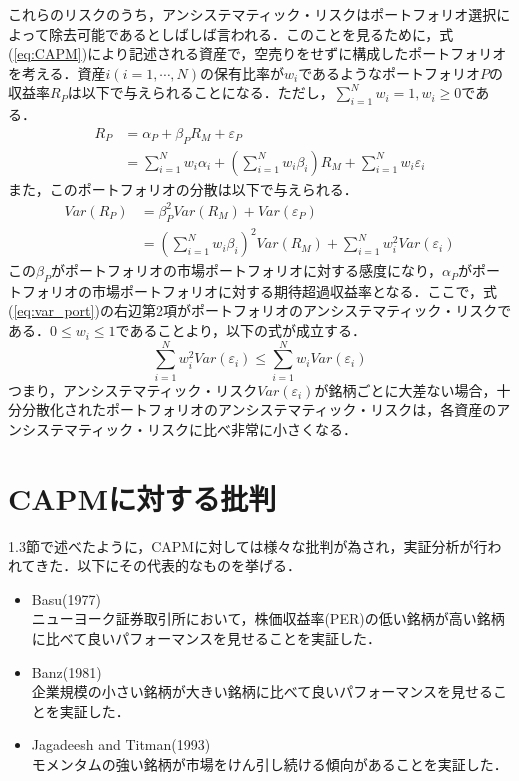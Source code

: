 ﻿\documentclass[11pt]{jreport}
\begin{document}
これらのリスクのうち，アンシステマティック・リスクはポートフォリオ選択によって除去可能であるとしばしば言われる．このことを見るために，式(\ref{eq:CAPM})により記述される資産で，空売りをせずに構成したポートフォリオを考える．資産$i(i=1,\cdots,N)$の保有比率が$w_i$であるようなポートフォリオ$P$の収益率$R_P$は以下で与えられることになる．ただし，$\sum_{i=1}^N w_i = 1, w_i\geq0$である．
\begin{equation}
\begin{split}
R_P &= \alpha_P + \beta_PR_M + \varepsilon_P\\
&= \sum_{i=1}^N w_i\alpha_i
+\left(\sum_{i=1}^N w_i\beta_i\right)R_M
+\sum_{i=1}^N w_i\varepsilon_i
\end{split}
\end{equation}
また，このポートフォリオの分散は以下で与えられる．
\begin{equation}
\begin{split}
Var(R_P) &= \beta_P^2 Var(R_M) + Var(\varepsilon_P)\\
& = \left(\sum_{i=1}^N w_i\beta_i\right)^2Var(R_M) + \sum_{i=1}^N w_i^2 Var(\varepsilon_i)
\label{eq:var_port}
\end{split}
\end{equation}
この$\beta_P$がポートフォリオの市場ポートフォリオに対する感度になり，$\alpha_P$がポートフォリオの市場ポートフォリオに対する期待超過収益率となる．ここで，式(\ref{eq:var_port})の右辺第2項がポートフォリオのアンシステマティック・リスクである．$0\leq w_i \leq 1$であることより，以下の式が成立する．
\begin{equation}
\sum_{i=1}^N w_i^2Var(\varepsilon_i) \leq \sum_{i=1}^N w_iVar(\varepsilon_i)
\end{equation}
つまり，アンシステマティック・リスク$Var(\varepsilon_i)$が銘柄ごとに大差ない場合，十分分散化されたポートフォリオのアンシステマティック・リスクは，各資産のアンシステマティック・リスクに比べ非常に小さくなる．



\section{CAPMに対する批判}
1.3節で述べたように，CAPMに対しては様々な批判が為され，実証分析が行われてきた．以下にその代表的なものを挙げる．
\begin{itemize}
\item Basu(1977)\cite{Basu}\\
ニューヨーク証券取引所において，株価収益率(PER)の低い銘柄が高い銘柄に比べて良いパフォーマンスを見せることを実証した．
\item Banz(1981)\cite{Banz}\\
企業規模の小さい銘柄が大きい銘柄に比べて良いパフォーマンスを見せることを実証した．
\item Jagadeesh and Titman(1993)\cite{Jagadeesh}\\
モメンタムの強い銘柄が市場をけん引し続ける傾向があることを実証した．
\end{itemize}
\end{document}
